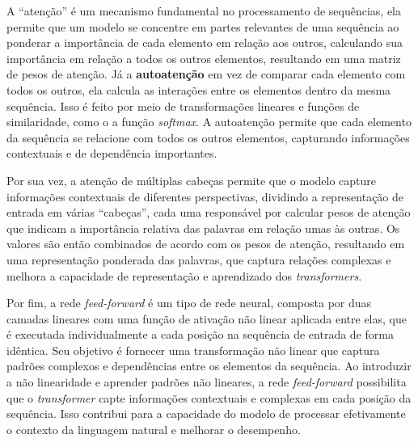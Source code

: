 A ``atenção'' é um mecanismo fundamental no processamento de sequências, ela permite que um modelo se concentre em partes relevantes de uma sequência ao ponderar a importância de cada elemento em relação aos outros, calculando sua importância em relação a todos os outros elementos, resultando em uma matriz de pesos de atenção. Já a \textbf{autoatenção} em vez de comparar cada elemento com todos os outros, ela calcula as interações entre os elementos dentro da mesma sequência. Isso é feito por meio de transformações lineares e funções de similaridade, como o a função \textit{softmax}. A autoatenção permite que cada elemento da sequência se relacione com todos os outros elementos, capturando informações contextuais e de dependência importantes. 

Por sua vez, a atenção de múltiplas cabeças permite que o modelo capture informações contextuais de diferentes perspectivas, dividindo a representação de entrada em várias ``cabeças'', cada uma responsável por calcular pesos de atenção que indicam a importância relativa das palavras em relação umas às outras. Os valores são então combinados de acordo com os pesos de atenção, resultando em uma representação ponderada das palavras, que captura relações complexas e melhora a capacidade de representação e aprendizado dos \textit{transformers}.

Por fim, a rede \textit{feed-forward} é um tipo de rede neural, composta por duas camadas lineares com uma função de ativação não linear aplicada entre elas, que é executada individualmente a cada posição na sequência de entrada de forma idêntica. Seu objetivo é fornecer uma transformação não linear que captura padrões complexos e dependências entre os elementos da sequência. Ao introduzir a não linearidade e aprender padrões não lineares, a rede \textit{feed-forward} possibilita que o \textit{transformer} capte informações contextuais e complexas em cada posição da sequência. Isso contribui para a capacidade do modelo de processar efetivamente o contexto da linguagem natural e melhorar o desempenho.

